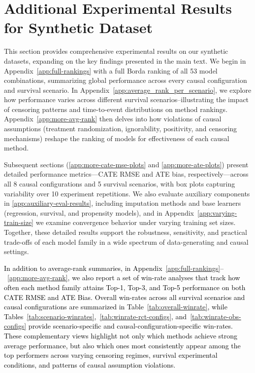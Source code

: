 \documentclass{article} %
\newcommand{\rebuttal}[1]{\textcolor{black}{#1}}
\begin{document}
\section{Additional Experimental Results for Synthetic Dataset}
\label{app:additional_synthetic_exps}

This section provides comprehensive experimental results on our synthetic datasets, expanding on the key findings presented in the main text. We begin in Appendix~\ref{app:full-rankings} with a full Borda ranking of all 53 model combinations, summarizing global performance across every causal configuration and survival scenario. In Appendix~\ref{app:average_rank_per_scenario}, we explore how performance varies across different survival scenarios--illustrating the impact of censoring patterns and time-to-event distributions on method rankings. Appendix~\ref{app:more-avg-rank} then delves into how violations of causal assumptions (treatment randomization, ignorability, positivity, and censoring mechanisms) reshape the ranking of models for effectiveness of each causal method.

Subsequent sections (\ref{app:more-cate-mse-plots} and \ref{app:more-ate-plots}) present detailed performance metrics---CATE RMSE and ATE bias, respectively---across all 8 causal configurations and 5 survival scenarios, with box plots capturing variability over 10 experiment repetitions. We also evaluate auxiliary components in \ref{app:auxiliary-eval-results}, including imputation methods and base learners (regression, survival, and propensity models), and in Appendix~\ref{app:varying-train-size} we examine convergence behavior under varying training set sizes. Together, these detailed results support the robustness, sensitivity, and practical trade-offs of each model family in a wide spectrum of data-generating and causal settings.

\rebuttal{In addition to average-rank summaries, in Appendix~\ref{app:full-rankings}--~\ref{app:more-avg-rank}, we also report a set of win-rate analyses that track how often each method family attains Top-1, Top-3, and Top-5 performance on both \textcolor{black}{CATE RMSE and ATE Bias}. Overall win-rates across all survival scenarios and causal configurations are summarized in Table~\ref{tab:overall-winrate}, while Tables~\ref{tab:scenario-winrates},~\ref{tab:winrate-rct-configs}, and~\ref{tab:winrate-obs-configs} provide scenario-specific and causal-configuration-specific win-rates. These complementary views highlight not only which methods achieve strong average performance, but also which ones most consistently appear among the top performers across varying censoring regimes, survival experimental conditions, and patterns of causal assumption violations.}
\end{document}
